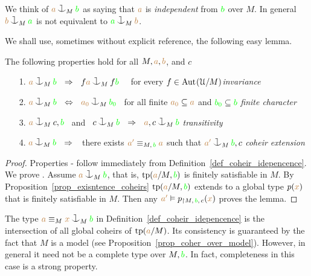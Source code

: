 \documentclass[creche.tex]{subfiles}
\begin{document}
We think of  ${\mr a}\cnonfork_M{\gr b}$ as saying that 
${\color{brown} a}$ is \emph{independent\/} from ${\color{green} b}$ over $M$.
%
%
In general %
${\mr b}\cnonfork_M{\gr a}$ is not 
equivalent to ${\gr a}\cnonfork_M{\mr b}$. 

We shall use, sometimes without explicit reference, the following easy lemma.

\begin{lemma}\label{lem_coheir_independence}
    The following properties hold for all $M,{\color{brown} a},{\color{brown} b}$, and $c$
    \begin{itemize}
    \item[1.] ${\mr a}\cnonfork_M{\gr b}\ \ \IMP\ \ f{\mr a}\cnonfork_Mf{\gr b}$ \ \ 
              for every $f\in{\rm Aut\kern.15ex}(\EuScript U/M)$\hfill \textit{invariance}
    \item[2.] ${\mr a}\cnonfork_M{\gr b}\ \ \IFF\ \ {\mr a_0}\cnonfork_M{\gr b_0}$
              \ for all finite ${\color{brown} a_0}\subseteq{\color{brown}a}$ and 
              ${\color{green} b_0}\subseteq{\color{green}b}$ \hfill\textit{finite character}
    \item[3.] ${\mr a}\cnonfork_Mc,{\gr b}$ \ and \ 
              $c\cnonfork_M{\gr b}\ \ \IMP\ \ {\mr a},c\cnonfork_M{\gr b}$
              \hfill\hfill\hfill\textit{transitivity}
    \item[4.] ${\mr a}\cnonfork_M{\gr b}\ \ \IMP\ \ $ 
              there exists ${\color{brown} a'}\equiv_{M,\,{\color{green} b}}{\color{brown} a}$ such that 
              ${\mr a'}\cnonfork_M{\gr b},c$
              \hspace{\stretch{20}}\textit{coheir extension}\QED
    \end{itemize}
    \end{lemma}
\begin{proof}

Properties - follow immediately from Definition~\ref{def_coheir_idepencence}.
We prove .
Assume ${\mr a}\cnonfork_M{\gr b}$, that is,  ${\rm tp}({\color{brown} a}/M,{\color{green} b})$ is finitely satisfiable in $M$. By Proposition~\ref{prop_exisntence_coheirs} ${\rm tp}({\color{brown} a}/M,{\color{green} b})$ extends to a global type $p({\color{brown} x})$ that is finitely satisfiable in $M$.
Then any ${\color{brown} a'}\vDash p_{\restriction M,\,{\color{green} b},\,c}({\color{brown} x})$ proves the lemma.
\end{proof}


The type ${\mr a}\equiv_M{\mr x}\cnonfork_M{\gr b}$ in Definition~\ref{def_coheir_idepencence} is the intersection of all global coheirs of ${\rm tp}({\color{brown} a}/M)$.
%
Its consistency is guaranteed by the fact that $M$ is a model (see Proposition~\ref{prop_coher_over_model}).
%
However, in general it need not be a complete type over $M,{\color{green} b}$.
%
In fact, completeness in this case is a strong property.
\end{document}
